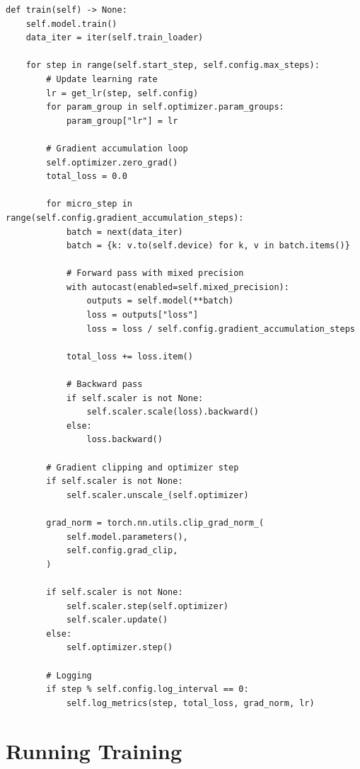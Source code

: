 \begin{lstlisting}[style=python, caption={Complete training step from trainer.py}]
def train(self) -> None:
    self.model.train()
    data_iter = iter(self.train_loader)

    for step in range(self.start_step, self.config.max_steps):
        # Update learning rate
        lr = get_lr(step, self.config)
        for param_group in self.optimizer.param_groups:
            param_group["lr"] = lr

        # Gradient accumulation loop
        self.optimizer.zero_grad()
        total_loss = 0.0

        for micro_step in range(self.config.gradient_accumulation_steps):
            batch = next(data_iter)
            batch = {k: v.to(self.device) for k, v in batch.items()}

            # Forward pass with mixed precision
            with autocast(enabled=self.mixed_precision):
                outputs = self.model(**batch)
                loss = outputs["loss"]
                loss = loss / self.config.gradient_accumulation_steps

            total_loss += loss.item()

            # Backward pass
            if self.scaler is not None:
                self.scaler.scale(loss).backward()
            else:
                loss.backward()

        # Gradient clipping and optimizer step
        if self.scaler is not None:
            self.scaler.unscale_(self.optimizer)

        grad_norm = torch.nn.utils.clip_grad_norm_(
            self.model.parameters(),
            self.config.grad_clip,
        )

        if self.scaler is not None:
            self.scaler.step(self.optimizer)
            self.scaler.update()
        else:
            self.optimizer.step()

        # Logging
        if step % self.config.log_interval == 0:
            self.log_metrics(step, total_loss, grad_norm, lr)
\end{lstlisting}

\section{Running Training}

